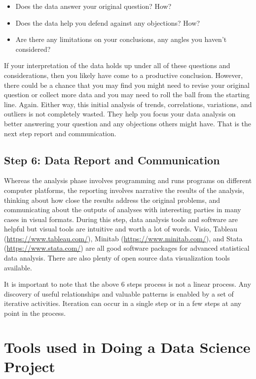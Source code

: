 \documentclass[
]{book}
\providecommand{\tightlist}{%
  \setlength{\itemsep}{0pt}\setlength{\parskip}{0pt}}
\begin{document}
\begin{itemize}
\tightlist
\item
  Does the data answer your original question? How?
\item
  Does the data help you defend against any objections? How?
\item
  Are there any limitations on your conclusions, any angles you haven't considered?
\end{itemize}

If your interpretation of the data holds up under all of these questions and considerations, then you likely have come to a productive conclusion. However, there could be a chance that you may find you might need to revise your original question or collect more data and you may need to roll the ball from the starting line. Again. Either way, this initial analysis of trends, correlations, variations, and outliers is not completely wasted. They help you focus your data analysis on better answering your question and any objections others might have. That is the next step report and communication.

\hypertarget{step-6-data-report-and-communication}{%
\subsection*{Step 6: Data Report and Communication}\label{step-6-data-report-and-communication}}


Whereas the analysis phase involves programming and runs programs on different computer platforms, the reporting involves narrative the results of the analysis, thinking about how close the results address the original problems, and communicating about the outputs of analyses with interesting parties in many cases in visual formats.
During this step, data analysis tools and software are helpful but visual tools are intuitive and worth a lot of words. Visio, Tableau (\url{https://www.tableau.com/}), Minitab (\url{https://www.minitab.com/}), and Stata (\url{https://www.stata.com/}) are all good software packages for advanced statistical data analysis. There are also plenty of open source data visualization tools available.

It is important to note that the above 6 steps process is not a linear process. Any discovery of useful relationships and valuable patterns is enabled by a set of iterative activities. Iteration can occur in a single step or in a few steps at any point in the process.

\hypertarget{tools-used-in-doing-a-data-science-project}{%
\section{Tools used in Doing a Data Science Project}\label{tools-used-in-doing-a-data-science-project}}
\end{document}

